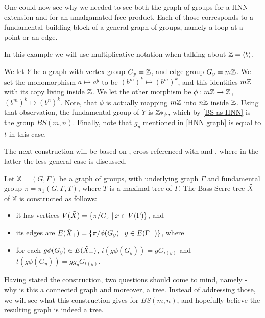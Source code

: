 \begin{remark}
    One could now see why we needed to see both the graph of groups for a HNN extension and for an amalgamated free product. Each of those corresponds to a fundamental building block of a general graph of groups, namely a loop at a point or an edge.
\end{remark}

\begin{importantexample} \label{BS graph} In this example we will use multiplicative notation when talking about $\mathbb{Z} = \langle b \rangle$. 

We let $Y$ be a graph with vertex group $G_p = \mathbb{Z}$, and edge group $G_y = m\mathbb{Z}$. We set the monomorphism $a \mapsto a^y$ to be $(b^m)^k \mapsto (b^m)^k$, and this identifies $m\mathbb{Z}$ with its copy living inside $\mathbb{Z}$. We let the other morphism be $\phi: m\mathbb{Z} \to \mathbb{Z}$, $(b^m)^k \mapsto (b^n)^k$. Note, that $\phi$ is actually mapping $m\mathbb{Z}$ into $n\mathbb{Z}$ inside $\mathbb{Z}$. Using that observation, the fundamental group of $Y$ is $\mathbb{Z} \ast _\phi$, which by \ref{BS as HNN} is the group $BS(m,n)$. Finally, note that $g_y$ mentioned in \ref{HNN graph} is equal to $t$ in this case.
\end{importantexample}

The next construction will be based on \cite[pages 23-24]{GoPaXi24}, cross-referenced with \cite{Wil} and \cite{BajoHNN}, where in the latter the less general case is discussed.

\begin{construction} \label{universalcover}
    Let $\mathbb{X} = (G,\Gamma)$ be a graph of groups, with underlying graph $\Gamma$ and fundamental group $\pi = \pi_1(G,\Gamma,T)$, where $T$ is a maximal tree of $\Gamma$.
    The Bass-Serre tree $\Tilde{X}$ of $\mathbb{X}$ is constructed as follows:
    \begin{itemize}
        \item it has vertices $V(\Tilde{X}) = \{\pi/G_x\:|\: x \in V(\Gamma)\}$, and
        \item its edges are $E(\Tilde{X}_+) = \{\pi/\phi(G_y) \: | \: y \in E(\Gamma_+)\}$, where
        \item for each $g\phi(G_y) \in E(\Tilde{X}_+)$, $i(g\phi(G_y)) = gG_{i(y)}$ and $t(g\phi(G_y)) = gg_yG_{t(y)}$.
    \end{itemize}
\end{construction}

Having stated the construction, two questions should come to mind, namely - why is this a connected graph and moreover, a tree. Instead of addressing those, we will see what this construction gives for $BS(m,n)$, and hopefully believe the resulting graph is indeed a tree.


